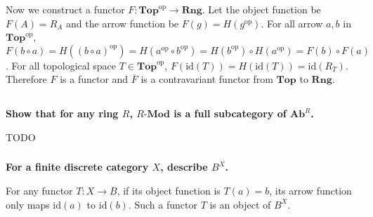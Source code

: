 \documentclass{article}
\begin{document}
Now we construct a functor $F : \mathbf{Top}^{\mathrm{op}} \rightarrow \mathbf{Rng}$. Let the object function be $F(A) = R_A$ and the arrow function be $F(g) = H(g^{\mathrm{op}})$. For all arrow $a, b$ in $\mathbf{Top}^{\mathrm{op}}$, $F(b \circ a) = H((b \circ a)^{\mathrm{op}}) = H(a^{\mathrm{op}} \circ b^{\mathrm{op}}) = H(b^{\mathrm{op}}) \circ H(a^{\mathrm{op}}) = F(b) \circ F(a)$. For all topological space $T \in \mathbf{Top}^{\mathrm{op}}$, $F(\mathrm{id}(T)) = H(\mathrm{id}(T)) = \mathrm{id}(R_T)$. Therefore $F$ is a functor and $\overline{F}$ is a contravariant functor from $\mathbf{Top}$ to $\mathbf{Rng}$.

\subsection{}

\subsubsection{}

\textbf{Show that for any ring $R$, $R\textbf{-}\mathbf{Mod}$ is a full subcategory of $\mathbf{Ab}^R$.}

TODO






\subsubsection{}

\textbf{For a finite discrete category $X$, describe $B^X$.}

For any functor $T : X \rightarrow B$, if its object function is $T(a) = b$, its arrow function only maps $\mathrm{id}(a)$ to $\mathrm{id}(b)$. Such a functor $T$ is an object of $B^X$.
\end{document}
